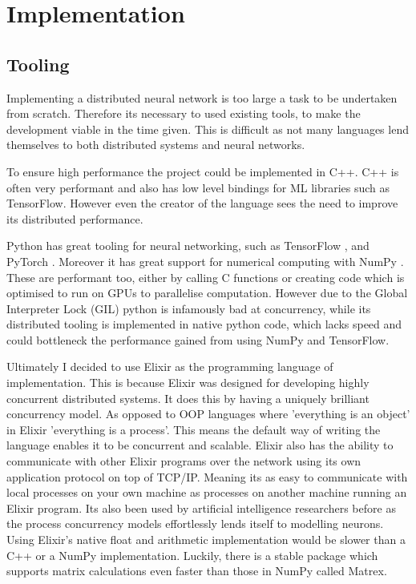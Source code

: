 \clearpage
\section{Implementation}

\subsection{Tooling}
Implementing a distributed neural network is too large a task to be undertaken
from scratch. Therefore its necessary to used existing tools, to make the
development viable in the time given. This is difficult as not many languages
lend themselves to both distributed systems and neural networks.

To ensure high performance the project could be implemented in C++. C++ is
often very performant and also has low level bindings for ML libraries such as
TensorFlow. However even the creator of the language sees the need to improve
its distributed performance. \cite{stroustrupInterview}

Python has great tooling for neural networking, such as TensorFlow
\cite{abadi2016tensorflow}, and PyTorch \cite{paszke2019pytorch}. Moreover it
has great support for numerical computing with NumPy \cite{harrisNumpy2020}.
These are performant too, either by calling C functions or creating code which is
optimised to run on GPUs to parallelise computation. However due to the Global
Interpreter Lock (GIL) python is infamously bad at concurrency, while its
distributed tooling is implemented in native python code, which lacks speed
and could bottleneck the performance gained from using NumPy and TensorFlow.

Ultimately I decided to use Elixir as the programming language of
implementation. This is because Elixir was designed for developing highly
concurrent distributed systems. It does this by having a uniquely brilliant
concurrency model. As opposed to OOP languages where 'everything is an object'
in Elixir 'everything is a process'. This means the default way of writing the
language enables it to be concurrent and scalable. Elixir also has the ability
to communicate with other Elixir programs over the network using its own
application protocol on top of TCP/IP. Meaning its as easy to communicate with
local processes on your own machine as processes on another machine running an
Elixir program. Its also been used by artificial intelligence researchers before
as the process concurrency models effortlessly lends itself to modelling
neurons. \cite{sherNeuroevolutionThroughErlang} Using Elixir's native float and
arithmetic implementation would be slower than a C++ or a NumPy implementation.
Luckily, there is a stable package which supports matrix calculations even faster
than those in NumPy called Matrex. \cite{matrex}

